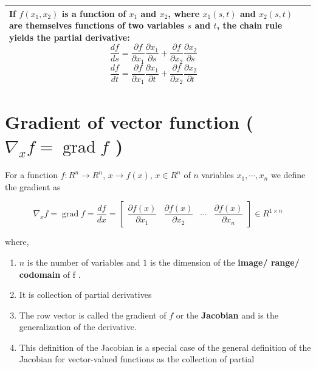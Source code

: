 \begin{table}[h]
\begin{tabular}{|p{2.5cm}|p{12.5cm}|}
\begin{minipage}{12cm}
            If $f(x_1, x_2)$ is a function of $x_1$ and $x_2$, where $x_1(s, t)$ and $x_2(s, t)$ are themselves functions of two variables $s$ and $t$, the chain rule yields the partial derivative:
            \[
                \dfrac{df}{ds}
                = \dfrac{\partial f}{\partial x_1}
                \dfrac{\partial x_1}{\partial s}
                +
                \dfrac{\partial f}{\partial x_2}
                \dfrac{\partial x_2}{\partial s}
            \]
            \[
                \dfrac{df}{dt}
                = \dfrac{\partial f}{\partial x_1}
                \dfrac{\partial x_1}{\partial t}
                +
                \dfrac{\partial f}{\partial x_2}
                \dfrac{\partial x_2}{\partial t}
            \]
            \vspace{0.1cm}
        \end{minipage} \\
        \hline
    \end{tabular}
\end{table}


\section{Gradient of vector function ( $\nabla _xf = \operatorname{grad} f$ )}\label{Gradient of vector function}

For a function $f : R^n \to R^n$, $x \to f(x)$, $x \in R^n$ of $n$ variables $x_1, \cdots , x_n$ we define the gradient as

\[
    \nabla_x f = 
    \operatorname{grad} f = 
    \dfrac{df}{dx} =
    \begin{bmatrix}
        \dfrac{\partial f(x)}{\partial x_1} &
        \dfrac{\partial f(x)}{\partial x_2} &
        \cdots &
        \dfrac{\partial f(x)}{\partial x_n}
    \end{bmatrix}
    \in R^{1\times n}
\]

\noindent where,
\begin{enumerate}
    \item $n$ is the number of variables and $1$ is the dimension of the \textbf{image/ range/ codomain} of f . 

    \item It is collection of partial derivatives  

    \item The row vector is called the gradient of $f$ or the \textbf{Jacobian} and is the generalization of the derivative.

    \item This definition of the Jacobian is a special case of the general definition of the Jacobian for vector-valued functions as the collection of partial
\end{enumerate}

